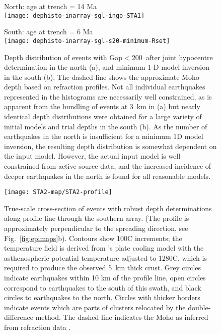 \documentclass[reviewcopy]{elsarticle}
\renewcommand{\includegraphics}[2][]{\fbox{#2}}
\begin{document}
\begin{figure}

\begin{minipage}[t]{0.4\textwidth}
{ North: age at trench = 14 Ma} \\
\texttt{[image: dephisto-inarray-sgl-ingo-STA1]}
\end{minipage}\hfill%
\begin{minipage}[t]{0.4\textwidth}
{ South: age at trench = 6 Ma} \\
\texttt{[image: dephisto-inarray-sgl-s20-minimum-Rset]}
\end{minipage}


\caption{Depth distribution of events with
  Gap$<$200\dg\ after  joint
  hypocentre determination in the north (a), and minimum 1-D model
inversion in the south (b). The
  dashed line shows the approximate Moho depth based on refraction
profiles.
Not all individual earthquakes represented in the
  histograms are necessarily well constrained, as is apparent from the
  bundling of events at 3~km in (a) but nearly identical depth distributions were
  obtained for a large variety of initial models and trial depths in
  the south
  (b).  As the number of earthquakes in the north is insufficient for
  a minimum 1D model inversion, the resulting depth distribution is
  somewhat dependent on the input model.  However, the actual input model
  is well constrained from active source data, and the increased
  incidence of deeper earthquakes in the north is found for all
  reasonable models.
}
\label{fig:dephistos}
\end{figure}


\begin{figure}
\centering
\texttt{[image: STA2-map/STA2-profile]}
\caption{True-scale cross-section of events with robust depth determinations along
  profile line through the southern array. (The profile is
  approximately perpendicular to the spreading direction, see Fig.~\ref{fig:epimaps}b). Contours show 100\dg C increments; the temperature field is derived
  from \citeauthor{mckenzie05}'s \citeyearpar{mckenzie05} plate cooling model with the
  asthenospheric potential temperature adjusted to 1280\dg C, which is
  required to produce the observed 5~km thick crust. Grey circles
  indicate earthquakes within 10 km of the profile line, open circles
  correspond to earthquakes to the south of this swath, and black circles to
  earthquakes to the north. Circles with thicker borders indicate
  events which are parts of clusters relocated by the
  double-difference method.
The dashed line indicates the Moho as inferred from refraction data \citep{scherwath06}.}
\label{fig:profiles}
\end{figure}
\end{document}
